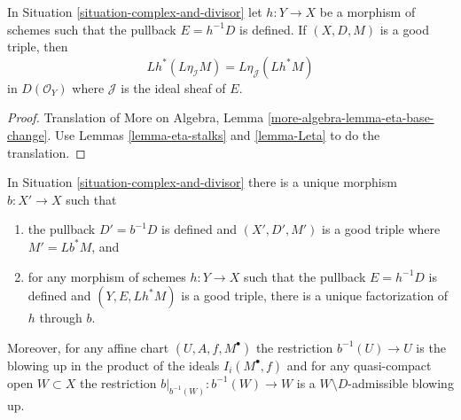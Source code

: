 \begin{lemma}
\label{lemma-complex-and-divisor-eta-pull}
In Situation \ref{situation-complex-and-divisor} let $h : Y \to X$
be a morphism of schemes such that the pullback $E = h^{-1}D$
is defined. If $(X, D, M)$ is a good triple, then
$$
Lh^*(L\eta_\mathcal{I}M) = L\eta_\mathcal{J}(Lh^*M)
$$
in $D(\mathcal{O}_Y)$ where $\mathcal{J}$ is the ideal sheaf of $E$.
\end{lemma}

\begin{proof}
Translation of
More on Algebra, Lemma \ref{more-algebra-lemma-eta-base-change}.
Use Lemmas \ref{lemma-eta-stalks} and \ref{lemma-Leta}
to do the translation.
\end{proof}

\begin{lemma}
\label{lemma-complex-and-divisor-blowup-pre}
In Situation \ref{situation-complex-and-divisor}
there is a unique morphism $b : X' \to X$ such that
\begin{enumerate}
\item the pullback $D' = b^{-1}D$ is defined and
$(X', D', M')$ is a good triple where $M' = Lb^*M$, and
\item for any morphism of schemes $h : Y \to X$ such that
the pullback $E = h^{-1}D$ is defined and $(Y, E, Lh^*M)$
is a good triple, there is a unique factorization of $h$ through $b$.
\end{enumerate}
Moreover, for any affine chart $(U, A, f, M^\bullet)$ the restriction
$b^{-1}(U) \to U$ is the blowing up in the product of the ideals
$I_i(M^\bullet, f)$ and for any quasi-compact open $W \subset X$ the
restriction $b|_{b^{-1}(W)} : b^{-1}(W) \to W$ is a $W \setminus D$-admissible
blowing up.
\end{lemma}


